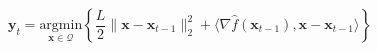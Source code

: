 \documentclass[border=2pt,varwidth]{standalone}
\begin{document}
\[
 \mathbf{y}_t = \underset{\mathbf{x}\in\mathcal{Q}}{\text{argmin}} \left\{
  \frac{L}{2} \| \mathbf{x} - \mathbf{x}_{t-1} \|_2^2 +
  \langle \nabla \hat{f} (\mathbf{x}_{t-1}),
          \mathbf{x} - \mathbf{x}_{t-1} \rangle
 \right\}
\]
\end{document}
